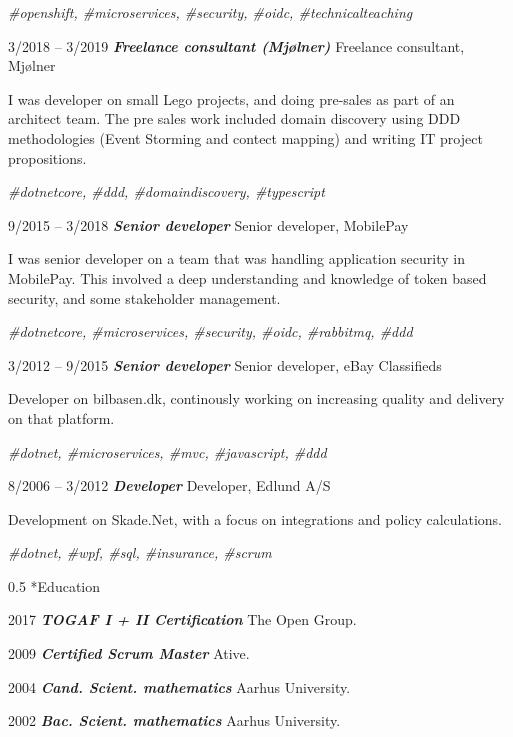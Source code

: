\documentclass[10pt,a4,sans]{article}
\makeatletter
\renewcommand{\section}{\@startsection{section}{12}
{0mm} 
{0.8\baselineskip} %
{0.5\baselineskip} %
{\Large\scshape
\vspace{0.5\baselineskip}
}}
\makeatother
\begin{document}
\begin{CV}
\emph{\#openshift, \#microservices, \#security, \#oidc, \#technicalteaching}

    \item[3/2018 -- 3/2019] \textbf{\emph{Freelance consultant (Mjølner)}} Freelance consultant, Mjølner
    
I was developer on small Lego projects, and doing pre-sales as part of an architect team. The pre sales work included domain discovery using DDD methodologies (Event Storming and contect mapping) and writing IT project propositions.

\emph{\#dotnetcore, \#ddd, \#domaindiscovery, \#typescript}
 
    \item[9/2015 -- 3/2018] \textbf{\emph{Senior developer}} Senior developer, MobilePay 

I was senior developer on a team that was handling application security in MobilePay. This involved a deep understanding and knowledge of token based security, and some stakeholder management.

\emph{\#dotnetcore, \#microservices, \#security, \#oidc, \#rabbitmq, \#ddd}

    \item[3/2012 -- 9/2015] \textbf{\emph{Senior developer}} Senior developer, eBay Classifieds 
    
Developer on bilbasen.dk, continously working on increasing quality and delivery on that platform.
    
\emph{\#dotnet, \#microservices, \#mvc, \#javascript, \#ddd}

    \item[8/2006 -- 3/2012] \textbf{\emph{Developer}} Developer, Edlund A/S 
    
Development on Skade.Net, with a focus on integrations and policy calculations.

\emph{\#dotnet, \#wpf, \#sql, \#insurance, \#scrum}
    
\end{CV}

\section*{Education}

\begin{CV}
    \item[2017] \textbf{\emph{TOGAF I + II Certification}} The Open Group.
    \item[2009] \textbf{\emph{Certified Scrum Master}} Ative.
    \item[2004] \textbf{\emph{Cand. Scient. mathematics}} Aarhus University.
    \item[2002] \textbf{\emph{Bac. Scient. mathematics}} Aarhus University.
\end{CV}
\end{document}
